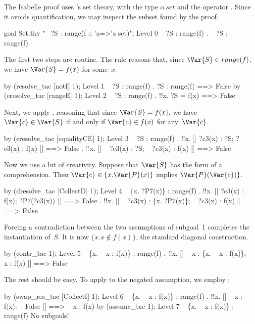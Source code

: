 The Isabelle proof uses {\HOL}'s set theory, with the type $\alpha\,set$ and
the operator .  Since it avoids quantification, we may
inspect the subset found by the proof.
\begin{ttbox}
goal Set.thy "~ ?S : range(f :: 'a=>'a set)";
{\out Level 0}
{\out ~ ?S : range(f)}
{. ~ ?S : range(f)}
\end{ttbox}
The first two steps are routine.  The rule  reasons that,
since $\Var{S}\in range(f)$, we have $\Var{S}=f(x)$ for some~$x$.
\begin{ttbox}
by (resolve_tac [notI] 1);
{\out Level 1}
{\out ~ ?S : range(f)}
{. ?S : range(f) ==> False}
by (eresolve_tac [rangeE] 1);
{\out Level 2}
{\out ~ ?S : range(f)}
{. !!x. ?S = f(x) ==> False}
\end{ttbox}
Next, we apply , reasoning that since $\Var{S}=f(x)$,
we have $\Var{c}\in \Var{S}$ if and only if $\Var{c}\in f(x)$ for
any~$\Var{c}$.
\begin{ttbox}
by (eresolve_tac [equalityCE] 1);
{\out Level 3}
{\out ~ ?S : range(f)}
{. !!x. [| ?c3(x) : ?S; ?c3(x) : f(x) |] ==> False}
{. !!x. [| ~ ?c3(x) : ?S; ~ ?c3(x) : f(x) |] ==> False}
\end{ttbox}
Now we use a bit of creativity.  Suppose that $\Var{S}$ has the form of a
comprehension.  Then $\Var{c}\in\{x.\Var{P}(x)\}$ implies
$\Var{P}(\Var{c})\}$.
\begin{ttbox}
by (dresolve_tac [CollectD] 1);
{\out Level 4}
{\out ~ \{x. ?P7(x)\} : range(f)}
{. !!x. [| ?c3(x) : f(x); ?P7(?c3(x)) |] ==> False}
{. !!x. [| ~ ?c3(x) : \{x. ?P7(x)\}; ~ ?c3(x) : f(x) |] ==> False}
\end{ttbox}
Forcing a contradiction between the two assumptions of subgoal~1 completes
the instantiation of~$S$.  It is now $\{x. x\not\in f(x)\}$, the standard
diagonal construction.
\begin{ttbox}
by (contr_tac 1);
{\out Level 5}
{\out ~ \{x. ~ x : f(x)\} : range(f)}
{. !!x. [| ~ x : \{x. ~ x : f(x)\}; ~ x : f(x) |] ==> False}
\end{ttbox}
The rest should be easy.  To apply  to the negated
assumption, we employ :
\begin{ttbox}
by (swap_res_tac [CollectI] 1);
{\out Level 6}
{\out ~ \{x. ~ x : f(x)\} : range(f)}
{. !!x. [| ~ x : f(x); ~ False |] ==> ~ x : f(x)}
by (assume_tac 1);
{\out Level 7}
{\out ~ \{x. ~ x : f(x)\} : range(f)}
{\out No subgoals!}
\end{ttbox}
